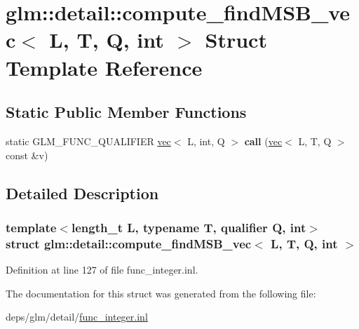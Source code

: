 \hypertarget{structglm_1_1detail_1_1compute__findMSB__vec}{}\section{glm\+:\+:detail\+:\+:compute\+\_\+find\+M\+S\+B\+\_\+vec$<$ L, T, Q, int $>$ Struct Template Reference}
\label{structglm_1_1detail_1_1compute__findMSB__vec}
\subsection*{Static Public Member Functions}
\begin{DoxyCompactItemize}
\item 
\mbox{\label{structglm_1_1detail_1_1compute__findMSB__vec_ab74bbcc16dd3f900d14de395a4689dbb}} 
static G\+L\+M\+\_\+\+F\+U\+N\+C\+\_\+\+Q\+U\+A\+L\+I\+F\+I\+ER \hyperlink{structglm_1_1vec}{vec}$<$ L, int, Q $>$ {\bfseries call} (\hyperlink{structglm_1_1vec}{vec}$<$ L, T, Q $>$ const \&v)
\end{DoxyCompactItemize}


\subsection{Detailed Description}
\subsubsection*{template$<$length\+\_\+t L, typename T, qualifier Q, int$>$\newline
struct glm\+::detail\+::compute\+\_\+find\+M\+S\+B\+\_\+vec$<$ L, T, Q, int $>$}



Definition at line 127 of file func\+\_\+integer.\+inl.



The documentation for this struct was generated from the following file\+:\begin{DoxyCompactItemize}
\item 
deps/glm/detail/\hyperlink{func__integer_8inl}{func\+\_\+integer.\+inl}\end{DoxyCompactItemize}
